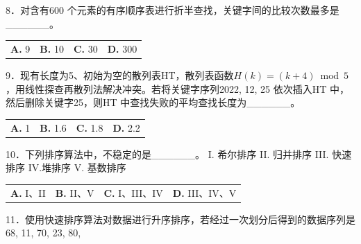 \documentclass[UTF8,11pt]{ctexart}
\begin{document}
8．对含有600 个元素的有序顺序表进行折半查找，关键字间的比较次数最多是\_\_\_\_\_\_。


\begin{center}\begin{tabular}{>{\raggedright\arraybackslash}p{\dimexpr(\linewidth-8\tabcolsep)/4\relax}>{\raggedright\arraybackslash}p{\dimexpr(\linewidth-8\tabcolsep)/4\relax}>{\raggedright\arraybackslash}p{\dimexpr(\linewidth-8\tabcolsep)/4\relax}>{\raggedright\arraybackslash}p{\dimexpr(\linewidth-8\tabcolsep)/4\relax}}
\textbf{A.} 9 & \textbf{B.} 10 & \textbf{C.} 30 & \textbf{D.} 300\\[.35em]\end{tabular}\end{center}

9．现有长度为5、初始为空的散列表HT，散列表函数\(\displaystyle H(k)=(k+4)\bmod 5\)，用线性探查再散列法解决冲突。若将关键字序列2022, 12, 25 依次插入HT 中，然后删除关键字25，则HT 中查找失败的平均查找长度为\_\_\_\_\_\_。


\begin{center}\begin{tabular}{>{\raggedright\arraybackslash}p{\dimexpr(\linewidth-8\tabcolsep)/4\relax}>{\raggedright\arraybackslash}p{\dimexpr(\linewidth-8\tabcolsep)/4\relax}>{\raggedright\arraybackslash}p{\dimexpr(\linewidth-8\tabcolsep)/4\relax}>{\raggedright\arraybackslash}p{\dimexpr(\linewidth-8\tabcolsep)/4\relax}}
\textbf{A.} 1 & \textbf{B.} 1.\allowbreak{}6 & \textbf{C.} 1.\allowbreak{}8 & \textbf{D.} 2.\allowbreak{}2\\[.35em]\end{tabular}\end{center}

10．下列排序算法中，不稳定的是\_\_\_\_\_\_。 I. 希尔排序 II. 归并排序 III. 快速排序 IV.堆排序 V. 基数排序


\begin{center}\begin{tabular}{>{\raggedright\arraybackslash}p{\dimexpr(\linewidth-8\tabcolsep)/4\relax}>{\raggedright\arraybackslash}p{\dimexpr(\linewidth-8\tabcolsep)/4\relax}>{\raggedright\arraybackslash}p{\dimexpr(\linewidth-8\tabcolsep)/4\relax}>{\raggedright\arraybackslash}p{\dimexpr(\linewidth-8\tabcolsep)/4\relax}}
\textbf{A.} I、II & \textbf{B.} II、V & \textbf{C.} I、III、IV & \textbf{D.} III、IV、V\\[.35em]\end{tabular}\end{center}

11．使用快速排序算法对数据进行升序排序，若经过一次划分后得到的数据序列是68, 11, 70, 23, 80,
\end{document}
